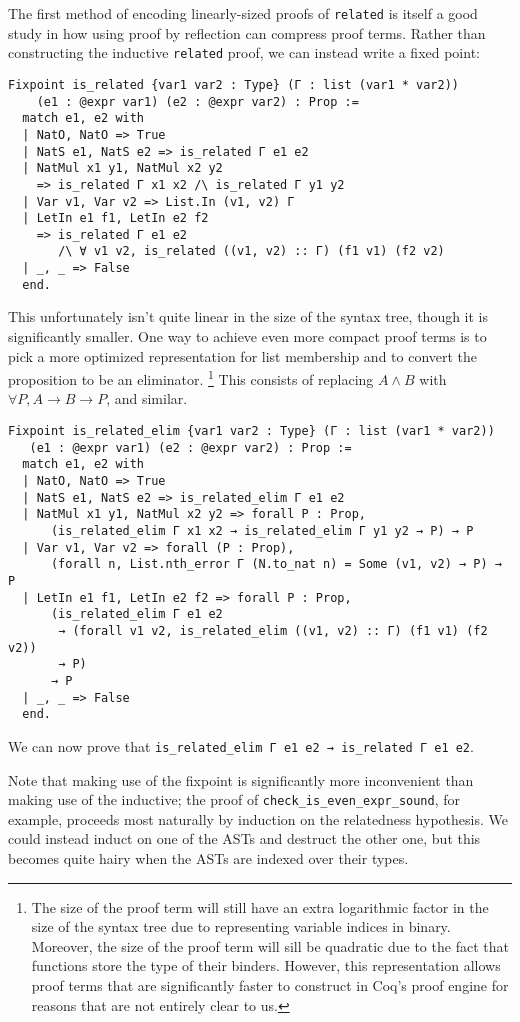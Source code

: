 The first method of encoding linearly-sized proofs of \texttt{related} is itself a good study in how using proof by reflection can compress proof terms.
Rather than constructing the inductive \texttt{related} proof, we can instead write a fixed point:
\begin{verbatim}
Fixpoint is_related {var1 var2 : Type} (Γ : list (var1 * var2))
    (e1 : @expr var1) (e2 : @expr var2) : Prop :=
  match e1, e2 with
  | NatO, NatO => True
  | NatS e1, NatS e2 => is_related Γ e1 e2
  | NatMul x1 y1, NatMul x2 y2
    => is_related Γ x1 x2 /\ is_related Γ y1 y2
  | Var v1, Var v2 => List.In (v1, v2) Γ
  | LetIn e1 f1, LetIn e2 f2
    => is_related Γ e1 e2
       /\ ∀ v1 v2, is_related ((v1, v2) :: Γ) (f1 v1) (f2 v2)
  | _, _ => False
  end.
\end{verbatim}
This unfortunately isn't quite linear in the size of the syntax tree, though it is significantly smaller.
One way to achieve even more compact proof terms is to pick a more optimized representation for list membership and to convert the proposition to be an eliminator.%
\footnote{%
  The size of the proof term will still have an extra logarithmic factor in the size of the syntax tree due to representing variable indices in binary.
  Moreover, the size of the proof term will sill be quadratic due to the fact that functions store the type of their binders.
  However, this representation allows proof terms that are significantly faster to construct in Coq's proof engine for reasons that are not entirely clear to us.
}
This consists of replacing $A \wedge B$ with $\forall P, A \to B \to P$, and similar.
\begin{verbatim}
Fixpoint is_related_elim {var1 var2 : Type} (Γ : list (var1 * var2))
   (e1 : @expr var1) (e2 : @expr var2) : Prop :=
  match e1, e2 with
  | NatO, NatO => True
  | NatS e1, NatS e2 => is_related_elim Γ e1 e2
  | NatMul x1 y1, NatMul x2 y2 => forall P : Prop,
      (is_related_elim Γ x1 x2 → is_related_elim Γ y1 y2 → P) → P
  | Var v1, Var v2 => forall (P : Prop),
      (forall n, List.nth_error Γ (N.to_nat n) = Some (v1, v2) → P) → P
  | LetIn e1 f1, LetIn e2 f2 => forall P : Prop,
      (is_related_elim Γ e1 e2
       → (forall v1 v2, is_related_elim ((v1, v2) :: Γ) (f1 v1) (f2 v2))
       → P)
      → P
  | _, _ => False
  end.
\end{verbatim}
We can now prove that \texttt{is_related_elim Γ e1 e2 → is_related Γ e1 e2}.

Note that making use of the fixpoint is significantly more inconvenient than making use of the inductive; the proof of \texttt{check_is_even_expr_sound}, for example, proceeds most naturally by induction on the relatedness hypothesis.
We could instead induct on one of the ASTs and destruct the other one, but this becomes quite hairy when the ASTs are indexed over their types.

